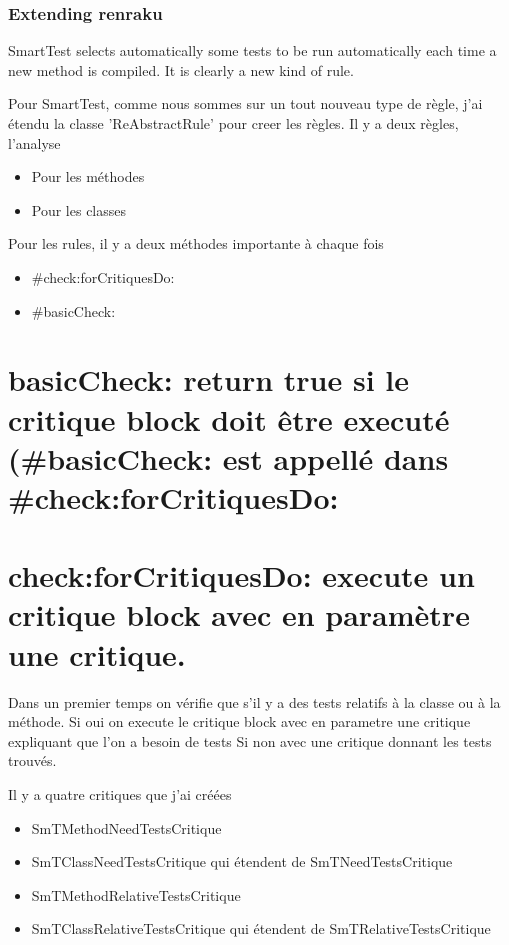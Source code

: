 \documentclass[10pt,twoside,english]{_support/latex/sbabook/sbabook}
\begin{document}
\section{Extending renraku}
SmartTest selects automatically some tests to be run automatically each time a new method is compiled.
It is clearly a new kind of rule.

Pour SmartTest, comme nous sommes sur un tout nouveau type de r\`{e}gle, j'ai \'{e}tendu la classe 'ReAbstractRule' pour creer les r\`{e}gles.
Il y a deux r\`{e}gles, l'analyse

\begin{itemize}
    \item Pour les m\'{e}thodes
    \item Pour les classes
\end{itemize}

Pour les rules, il y a deux m\'{e}thodes importante \`{a} chaque fois

\begin{itemize}
    \item \#check:forCritiquesDo:
    \item \#basicCheck:
\end{itemize}

\part{basicCheck: return true si le critique block doit \^{e}tre execut\'{e} (\#basicCheck: est appell\'{e} dans \#check:forCritiquesDo:}
\part{check:forCritiquesDo: execute un critique block avec en param\`{e}tre une critique.}
Dans un premier temps on v\'{e}rifie que s'il y a des tests relatifs \`{a} la classe ou \`{a} la m\'{e}thode.
Si oui on execute le critique block avec en parametre une critique expliquant que l'on a besoin de tests
Si non avec une critique donnant les tests trouv\'{e}s.

Il y a quatre critiques que j'ai cr\'{e}\'{e}es

\begin{itemize}
    \item SmTMethodNeedTestsCritique
    \item SmTClassNeedTestsCritique qui \'{e}tendent de SmTNeedTestsCritique
    \item SmTMethodRelativeTestsCritique
    \item SmTClassRelativeTestsCritique qui \'{e}tendent de SmTRelativeTestsCritique
\end{itemize}
\end{document}
